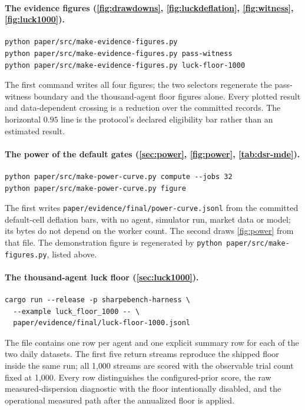 \paragraph{The evidence figures (\cref{fig:drawdowns}, \cref{fig:luckdeflation}, \cref{fig:witness}, \cref{fig:luck1000}).}
\begin{verbatim}
python paper/src/make-evidence-figures.py
python paper/src/make-evidence-figures.py pass-witness
python paper/src/make-evidence-figures.py luck-floor-1000
\end{verbatim}
The first command writes all four figures; the two selectors regenerate the pass-witness boundary and the thousand-agent floor figures alone. Every plotted result and data-dependent crossing is a reduction over the committed records. The horizontal $0.95$ line is the protocol's declared eligibility bar rather than an estimated result.

\paragraph{The power of the default gates (\cref{sec:power}, \cref{fig:power}, \cref{tab:dsr-mde}).}
\begin{verbatim}
python paper/src/make-power-curve.py compute --jobs 32
python paper/src/make-power-curve.py figure
\end{verbatim}
The first writes \texttt{paper/evidence/final/power-curve.jsonl} from the committed default-cell deflation bars, with no agent, simulator run, market data or model; its bytes do not depend on the worker count. The second draws \cref{fig:power} from that file. The demonstration figure is regenerated by \texttt{python paper/src/make-figures.py}, listed above.

\paragraph{The thousand-agent luck floor (\cref{sec:luck1000}).}
\begin{verbatim}
cargo run --release -p sharpebench-harness \
  --example luck_floor_1000 -- \
  paper/evidence/final/luck-floor-1000.jsonl
\end{verbatim}
The file contains one row per agent and one explicit summary row for each of the two daily datasets. The first five return streams reproduce the shipped floor inside the same run; all 1{,}000 streams are scored with the observable trial count fixed at 1{,}000. Every row distinguishes the configured-prior score, the raw measured-dispersion diagnostic with the floor intentionally disabled, and the operational measured path after the annualized floor is applied.

